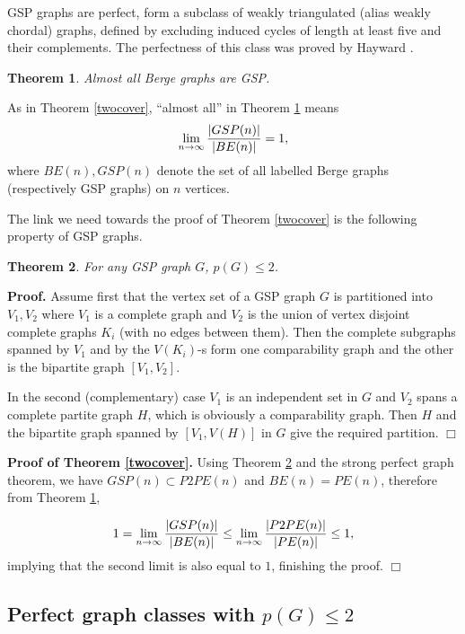 \documentclass[12pt]{article}
\newtheorem{theorem}{Theorem}%
\def\qed{\ifhmode\unskip\nobreak\fi\quad\ifmmode\Box\else$\Box$\fi}
\def\qed{\hfill $\Box$}
\begin{document}
GSP graphs are perfect, form a subclass of weakly triangulated (alias weakly chordal) graphs,
defined by excluding induced cycles of length at least five and their complements.
The perfectness of this class was proved by Hayward \cite{HA}.

\begin{theorem}\label{promelsteger}\cite{PS} Almost all Berge graphs are GSP.
\end{theorem}
As in Theorem \ref{twocover}, ``almost all'' in Theorem \ref{promelsteger} means
$$\lim_{n\rightarrow \infty} { |GSP(n)|\over|BE(n)|}=1,$$
where $BE(n),GSP(n)$ denote the set of all labelled Berge graphs (respectively GSP graphs) on $n$ vertices.





The link we need towards the proof of Theorem \ref{twocover} is the following property of GSP graphs.


\begin{theorem} \label{gensplit} For any GSP graph $G$, $p(G)\le 2$.
\end{theorem}


\noindent
    {\bf Proof. } Assume first that the vertex set of a GSP graph $G$ is partitioned into $V_1,V_2$ where $V_1$
    is a complete graph and $V_2$ is the union of vertex disjoint complete graphs $K_i$ (with no edges between them).
    Then the complete subgraphs spanned by $V_1$ and by the $V(K_i)$-s form one comparability graph and the other is the bipartite graph
    $[V_1,V_2]$.

    In the second (complementary) case $V_1$ is an independent set in $G$ and $V_2$ spans a
    complete partite graph $H$, which is obviously a comparability graph.
    Then $H$ and the bipartite graph spanned by $[V_1,V(H)]$ in $G$ give the required partition.   \qed

\medskip





\noindent
{\bf Proof of Theorem \ref{twocover}.} Using Theorem  \ref{gensplit} and the strong perfect graph theorem, we have
$GSP(n)\subset P2PE(n)$ and $BE(n)=PE(n)$, therefore from Theorem \ref{promelsteger},

$$1=\lim_{n\rightarrow \infty} {|GSP(n)|\over |BE(n)|}\le \lim_{n\rightarrow \infty}{|P2PE(n)|\over |PE(n)|}\le 1,$$
implying that the second limit is also equal to $1$, finishing the proof. \qed


\subsection{Perfect graph classes with $p(G)\le 2$}
\end{document}
